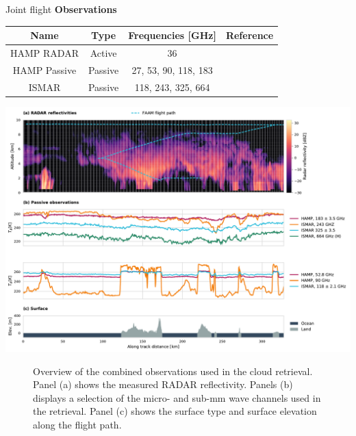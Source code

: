 \documentclass[8pt, final,hyperref={pdfpagelabels=false}]{beamer}
\begin{document}
\begin{frame}
\begin{columns}[t]
\begin{column}{.48\linewidth}
\begin{block}{Joint flight}
           \textbf{Observations}

           \vspace{1.5cm}
           \centering
          \begin{tabular}{|c|c|c|c|}
            \hline
            Name & Type & Frequencies [GHz]& Reference \\
            \hline
            \hline
            HAMP RADAR & Active  & 36  & \cite{hamp}\\
            \hline
            HAMP Passive & Passive  & 27,  53, 90, 118, 183 & \cite{hamp}\\
            \hline
            ISMAR & Passive  & 118, 243, 325, 664 & \cite{ismar} \\
            \hline
          \end{tabular}

            \includegraphics[width=1.0\textwidth]{../plots/observations_combined}
            \begin{figure}
            \centering
            \caption{Overview of the combined observations used in the cloud retrieval.
              Panel (a) shows the measured RADAR reflectivity. Panels (b) displays a
              selection of the micro- and sub-mm wave channels used in the retrieval.
              Panel (c) shows the surface type and surface elevation along the flight path.}
            \end{figure}
        \end{block}

          

\end{column}
\end{columns}
\end{frame}
\end{document}
